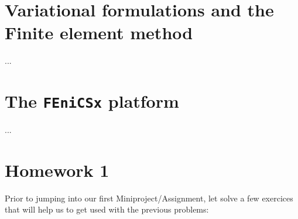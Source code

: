\section{Variational formulations and the Finite element method}

...

\section{The \texttt{FEniCSx} platform}

...

\section{Homework 1}


\iffalse

Prior to jumping into our first Miniproject/Assignment, let solve a few exercices that will
help us to get used with the previous problems:


